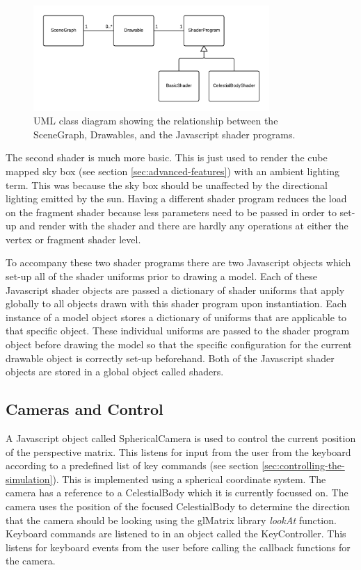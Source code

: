 \documentclass[paper=a4, fontsize=11pt]{scrartcl}	%
\numberwithin{equation}{section}															%
\numberwithin{figure}{section}																%
\numberwithin{table}{section}																%
\begin{document}
\begin{figure}[H]
\centering
\includegraphics[width=0.8\textwidth]{img/shader-uml.png}
\caption{UML class diagram showing the relationship between the SceneGraph, Drawables, and the Javascript shader programs.}
\label{fig:shaders-uml}
\end{figure}

The second shader is much more basic. This is just used to render the cube mapped sky box (see section \ref{sec:advanced-features}) with an ambient lighting term. This was because the sky box should be unaffected by the directional lighting emitted by the sun. Having a different shader program reduces the load on the fragment shader because less parameters need to be passed in order to set-up and render with the shader and there are hardly any operations at either the vertex or fragment shader level.

To accompany these two shader programs there are two Javascript objects which set-up all of the shader uniforms prior to drawing a model. Each of these Javascript shader objects are passed a dictionary of shader uniforms that apply globally to all objects drawn with this shader program upon instantiation. Each instance of a model object stores a dictionary of uniforms that are applicable to that specific object. These individual uniforms are passed to the shader program object before drawing the model so that the specific configuration for the current drawable object is correctly set-up beforehand. Both of the Javascript shader objects are stored in a global object called shaders.

\subsection{Cameras and Control}
A Javascript object called SphericalCamera is used to control the current position of the perspective matrix. This listens for input from the user from the keyboard according to a predefined list of key commands (see section \ref{sec:controlling-the-simulation}). This is implemented using a spherical coordinate system. The camera has a reference to a CelestialBody which it is currently focussed on. The camera uses the position of the focused CelestialBody to determine the direction that the camera should be looking using the glMatrix library \textit{lookAt} function. Keyboard commands are listened to in an object called the KeyController. This listens for keyboard events from the user before calling the callback functions for the camera.
\end{document}
